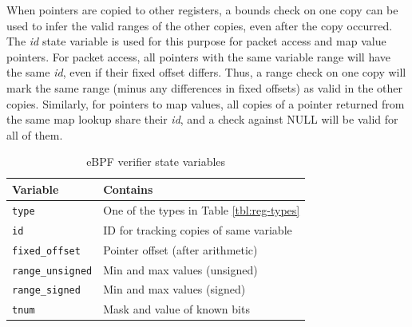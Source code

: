\documentclass[10pt,sigconf]{acmart}
\begin{document}
When pointers are copied to other registers, a bounds check on one copy can be
used to infer the valid ranges of the other copies, even after the copy
occurred. The \emph{id} state variable is used for this purpose for packet access and
map value pointers. For packet access, all pointers with the same variable
range will have the same \emph{id}, even if their fixed offset differs. Thus, a range
check on one copy will mark the same range (minus any differences in fixed
offsets) as valid in the other copies. Similarly, for pointers to map values,
all copies of a pointer returned from the same map lookup share their \emph{id}, and
a check against NULL will be valid for all of them.

\begin{table}[htbp]
\caption{\label{tbl:vrf-state-vars}
eBPF verifier state variables}
\centering
\begin{tabular}{ll}
\toprule
Variable & Contains\\
\midrule
\texttt{type} & One of the types in Table \ref{tbl:reg-types}\\
\texttt{id} & ID for tracking copies of same variable\\
\texttt{fixed\_offset} & Pointer offset (after arithmetic)\\
\texttt{range\_unsigned} & Min and max values (unsigned)\\
\texttt{range\_signed} & Min and max values (signed)\\
\texttt{tnum} & Mask and value of known bits\\
\bottomrule
\end{tabular}
\end{table}
\end{document}
